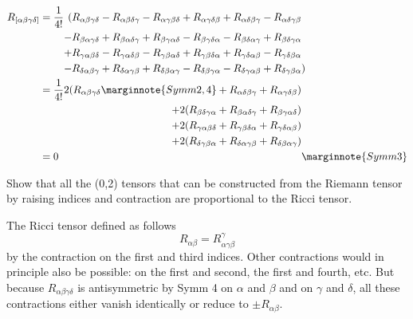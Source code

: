 \documentclass[10pt]{article}
\begin{document}
$$\begin{alignedat}{3}
	R_{[\alpha\beta\gamma\delta]}&= \frac{1}{4!}&(R_{\alpha\beta\gamma\delta}
	- R_{\alpha\beta\delta\gamma}
	- R_{\alpha\gamma\beta\delta}
	+ R_{\alpha\gamma\delta\beta}
	+ R_{\alpha\delta\beta\gamma}
	- R_{\alpha\delta\gamma\beta}&\\
	&&- R_{\beta\alpha\gamma\delta}
	+ R_{\beta\alpha\delta\gamma}
	+ R_{\beta\gamma\alpha\delta}
	- R_{\beta\gamma\delta\alpha}
	- R_{\beta\delta\alpha\gamma}
	+ R_{\beta\delta\gamma\alpha}&\\
	&&+ R_{\gamma\alpha\beta\delta}
	- R_{\gamma\alpha\delta\beta}
	- R_{\gamma\beta\alpha\delta}
	+ R_{\gamma\beta\delta\alpha}
	+ R_{\gamma\delta\alpha\beta}
	- R_{\gamma\delta\beta\alpha}&\\
	&&- R_{\delta\alpha\beta\gamma}
	+ R_{\delta\alpha\gamma\beta}
	+ R_{\delta\beta\alpha\gamma}
	- R_{\delta\beta\gamma\alpha}
	- R_{\delta\gamma\alpha\beta}
	+ R_{\delta\gamma\beta\alpha}&)\\
	&= \frac{1}{4!}&2(R_{\alpha\beta\gamma\delta}\marginnote{Symm 2, 4}
	+ R_{\alpha\delta\beta\gamma}
	+ R_{\alpha\gamma\delta\beta})&\\
	&&+ 2(R_{\beta\delta\gamma\alpha}
	+ R_{\beta\alpha\delta\gamma}
	+ R_{\beta\gamma\alpha\delta})&\\
	&&+ 2(R_{\gamma\alpha\beta\delta}
	+ R_{\gamma\beta\delta\alpha}
	+ R_{\gamma\delta\alpha\beta})&\\
	&&+ 2(R_{\delta\gamma\beta\alpha}
	+ R_{\delta\alpha\gamma\beta}
	+ R_{\delta\beta\alpha\gamma})&\\
	&=0&&\marginnote{Symm 3}
\end{alignedat}
$$


\begin{example}
	Show that all the (0,2) tensors that can be constructed from the Riemann tensor by raising indices and contraction are proportional to the Ricci tensor.
\end{example}
\sol The Ricci tensor defined as follows
$$
R_{\alpha\beta} = R_{\alpha\gamma\beta}^\gamma
$$
by the contraction on the first and third indices. Other contractions would in
principle also be possible: on the first and second, the first and fourth, etc. But because $R_{\alpha\beta\gamma\delta}$ is antisymmetric by Symm 4 on $\alpha$ and $\beta$ and on $\gamma$ and $\delta$, all these contractions either vanish identically or reduce to $\pm R_{\alpha\beta}$.
\end{document}
